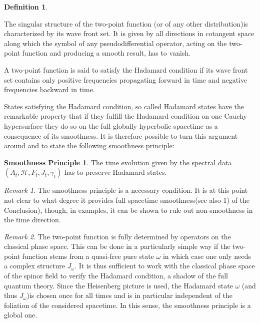 \documentclass[a4paper,10pt,oneside]{amsart}
\theoremstyle{plain}
\theoremstyle{definition}
\newtheorem{definition}{Definition}
\newtheorem*{smoothness_principle}{Smoothness Principle}
\theoremstyle{remark}
\newtheorem{remark}{Remark}
\begin{document}
\begin{definition}\label{hadamarddef}


  The singular structure of the two-point function
  (or of any other distribution)is characterized by its wave front set.
  It is given by all directions in cotangent space
  along which the symbol of any pseudodifferential operator, acting
  on the two-point
  function and producing a smooth result, has to vanish.

  A two-point function is said to satisfy
  the Hadamard condition if its wave
  front set contains only positive
  frequencies propagating forward in time
  and negative frequencies backward in time.
\end{definition}





 States satisfying the
Hadamard condition, so called Hadamard states have the remarkable property
that if they fulfill the Hadamard condition on one Cauchy
hypersurface they do so on the full globally hyperbolic spacetime
as a consequence of its smoothness. It is therefore possible to turn
this argument around and to state the following smoothness
principle:



\begin{smoothness_principle}\label{smoothnessprinciple}
The time evolution given by the spectral data $({A}_{t},
\mathcal{H}, {F}_{t}, {J}_{t},{\gamma}_{t} )$ has to preserve
Hadamard states.
\end{smoothness_principle}


\begin{remark}
The smoothness principle is a necessary condition. It is at this
point not clear to what degree it provides full spacetime
smoothness(see also 1) of the Conclusion), though, in examples, it
can be shown to rule out non-smoothness in the time direction.
\end{remark}
\begin{remark}

  The two-point function is fully determined by operators on the
  classical phase space. This can be done in a particularly simple
  way if the two-point function stems from a quasi-free pure state
  $\omega$ in which case one only needs a complex structure
  ${J}_{\omega}$. It is thus sufficient to work with the classical
  phase space of the spinor field to verify the Hadamard
  condition, a shadow of the full quantum theory. Since the
  Heisenberg picture is used, the Hadamard state $\omega$ (and thus
  ${J}_{\omega}$)is chosen once for all times and is in particular
  independent of the foliation of the considered spacetime. In
  this sense, the smoothness principle is a global one.
\end{remark}
\end{document}
